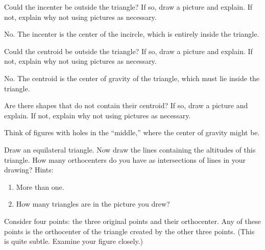 \documentclass[nooutcomes]{ximera}
\begin{document}
\begin{problem}
Could the incenter be outside the triangle? If so, draw a
  picture and explain. If not, explain why not using pictures as
  necessary.
\begin{freeResponse}
\begin{hint}
No.  The incenter is the center of the incircle, which is entirely inside the triangle.  
\end{hint}
\end{freeResponse}
\end{problem}

\begin{problem}
Could the centroid be outside the triangle? If so, draw a
  picture and explain. If not, explain why not using pictures as
  necessary.
\begin{freeResponse}
\begin{hint}
No. The centroid is the center of gravity of the triangle, which must lie inside the triangle.  
\end{hint}
\end{freeResponse}
\end{problem}

\begin{problem}
Are there shapes that do not contain their centroid? If so, draw
  a picture and explain. If not, explain why not using pictures as
  necessary.
\begin{freeResponse}
\begin{hint}
Think of figures with holes in the ``middle,'' where the center of gravity might be.  
\end{hint}
\end{freeResponse}
\end{problem}

\begin{problem}
Draw an equilateral triangle. Now draw the lines containing the
  altitudes of this triangle. How many orthocenters do you have as
  intersections of lines in your drawing? Hints:
\begin{enumerate}
\item More than one.
\item How many triangles are in the picture you drew?
\end{enumerate}
\begin{freeResponse}
\begin{hint}
Consider four points: the three original points and their orthocenter.  Any of these points is the orthocenter of the triangle created by the other three points.  (This is quite subtle.  Examine your figure closely.)
\end{hint}
\end{freeResponse}
\end{problem}
\end{document}
